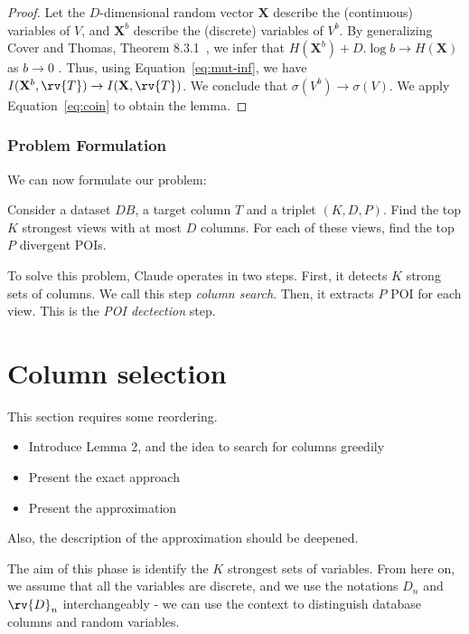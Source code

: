 \begin{proof}
    Let the $D$-dimensional random vector $\mathbf{X}$ describe the
    (continuous) variables of $V$, and $\mathbf{X}^b$ describe the (discrete)
    variables of $V^b$. By generalizing Cover and Thomas, Theorem
    8.3.1~\cite{cover2012elements}, we infer that $H(\mathbf{X}^b) + D.\log{b}
    \to H(\mathbf{X})$ as $b \to 0$ .  Thus, using Equation~\ref{eq:mut-inf},
    we have $I(\mathbf{X}^b, \rv{T}) \to I(\mathbf{X}, \rv{T})$. We conclude
    that $\sigma(V^b) \to \sigma(V)$. We apply Equation~\ref{eq:coin} to obtain
    the lemma.
\end{proof}

\subsubsection{Problem Formulation}

We can now formulate our problem:
\begin{problem}
Consider a dataset $DB$, a target column $T$ and a triplet $(K, D, P)$. Find
the top $K$ strongest views with at most $D$ columns. For each of these
views, find the top $P$ divergent POIs.
\end{problem}
To solve this problem, Claude operates in two steps. First, it detects $K$
strong sets of columns.  We call this step \emph{column search}.  Then, it
extracts $P$ POI for each view. This is the \emph{POI dectection} step.

\section{Column selection}
\label{sec:colum}

{\color{red} 
This section requires some reordering.
\begin{itemize}
    \item Introduce Lemma 2, and the idea to search for columns greedily
    \item Present the exact approach
    \item Present the approximation
\end{itemize}
Also, the description of the approximation should be deepened.
}

The aim of this phase is identify the $K$ strongest sets of variables. From
here on, we assume that all the variables are discrete, and we use the
notations $D_n$ and $\rv{D}_n$ interchangeably - we can use the context to
distinguish database columns and random variables.

